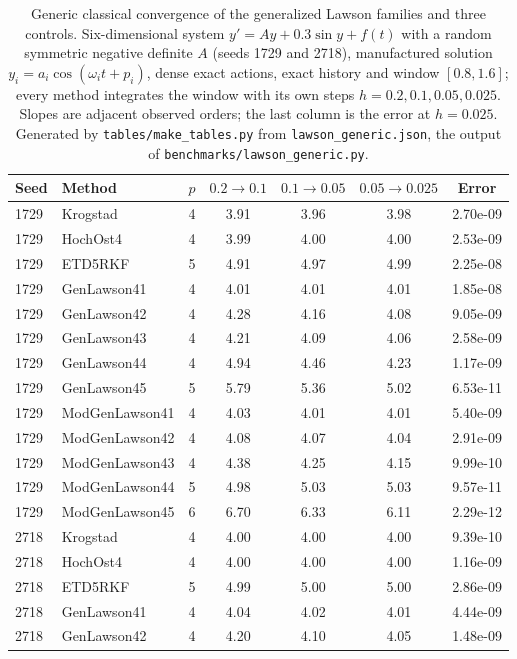 \begin{table}[p]
\centering\small
\caption{Generic classical convergence of the generalized Lawson families and three controls. Six-dimensional system $y'=Ay+0.3\sin y+f(t)$ with a random symmetric negative definite $A$ (seeds 1729 and 2718), manufactured solution $y_i=a_i\cos(\omega_it+p_i)$, dense exact actions, exact history and window $[0.8,1.6]$; every method integrates the window with its own steps $h=0.2,0.1,0.05,0.025$. Slopes are adjacent observed orders; the last column is the error at $h=0.025$. Generated by \texttt{tables/make\_tables.py} from \texttt{lawson\_generic.json}, the output of \texttt{benchmarks/lawson\_generic.py}.}\label{tab:lawson}
\begin{tabular}{@{}llcccc c@{}}\toprule
Seed & Method & $p$ & $0.2\to0.1$ & $0.1\to0.05$ & $0.05\to0.025$ & Error\\\midrule
1729 & Krogstad & 4 & 3.91 & 3.96 & 3.98 & 2.70e-09\\
1729 & HochOst4 & 4 & 3.99 & 4.00 & 4.00 & 2.53e-09\\
1729 & ETD5RKF & 5 & 4.91 & 4.97 & 4.99 & 2.25e-08\\
1729 & GenLawson41 & 4 & 4.01 & 4.01 & 4.01 & 1.85e-08\\
1729 & GenLawson42 & 4 & 4.28 & 4.16 & 4.08 & 9.05e-09\\
1729 & GenLawson43 & 4 & 4.21 & 4.09 & 4.06 & 2.58e-09\\
1729 & GenLawson44 & 4 & 4.94 & 4.46 & 4.23 & 1.17e-09\\
1729 & GenLawson45 & 5 & 5.79 & 5.36 & 5.02 & 6.53e-11\\
1729 & ModGenLawson41 & 4 & 4.03 & 4.01 & 4.01 & 5.40e-09\\
1729 & ModGenLawson42 & 4 & 4.08 & 4.07 & 4.04 & 2.91e-09\\
1729 & ModGenLawson43 & 4 & 4.38 & 4.25 & 4.15 & 9.99e-10\\
1729 & ModGenLawson44 & 5 & 4.98 & 5.03 & 5.03 & 9.57e-11\\
1729 & ModGenLawson45 & 6 & 6.70 & 6.33 & 6.11 & 2.29e-12\\
2718 & Krogstad & 4 & 4.00 & 4.00 & 4.00 & 9.39e-10\\
2718 & HochOst4 & 4 & 4.00 & 4.00 & 4.00 & 1.16e-09\\
2718 & ETD5RKF & 5 & 4.99 & 5.00 & 5.00 & 2.86e-09\\
2718 & GenLawson41 & 4 & 4.04 & 4.02 & 4.01 & 4.44e-09\\
2718 & GenLawson42 & 4 & 4.20 & 4.10 & 4.05 & 1.48e-09\\

\end{tabular}
\end{table}
